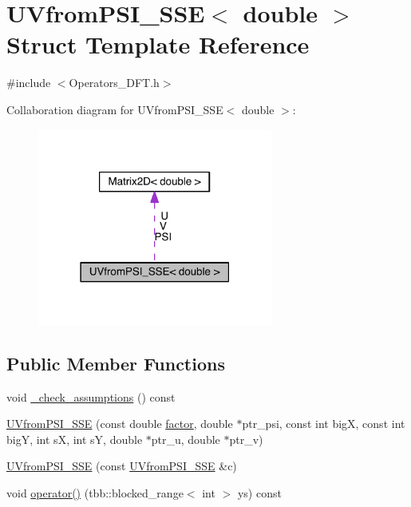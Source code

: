 \hypertarget{struct_u_vfrom_p_s_i___s_s_e_3_01double_01_4}{}\section{U\+Vfrom\+P\+S\+I\+\_\+\+S\+S\+E$<$ double $>$ Struct Template Reference}
\label{struct_u_vfrom_p_s_i___s_s_e_3_01double_01_4}


{\ttfamily \#include $<$Operators\+\_\+\+D\+F\+T.\+h$>$}



Collaboration diagram for U\+Vfrom\+P\+S\+I\+\_\+\+S\+S\+E$<$ double $>$\+:\nopagebreak
\begin{figure}[H]
\begin{center}
\leavevmode
\includegraphics[width=219pt]{dc/d60/struct_u_vfrom_p_s_i___s_s_e_3_01double_01_4__coll__graph}
\end{center}
\end{figure}
\subsection*{Public Member Functions}
\begin{DoxyCompactItemize}
\item 
void \hyperlink{struct_u_vfrom_p_s_i___s_s_e_3_01double_01_4_a819a9b7f93d5acd5dfb2dceb4c4b64a9}{\+\_\+check\+\_\+assumptions} () const 
\item 
\hyperlink{struct_u_vfrom_p_s_i___s_s_e_3_01double_01_4_ab18d50ac5b80e1cbae7d31b2e4db5a63}{U\+Vfrom\+P\+S\+I\+\_\+\+S\+S\+E} (const double \hyperlink{struct_u_vfrom_p_s_i___s_s_e_3_01double_01_4_a13a8e60c24481a28b30a5bfff9de6d57}{factor}, double $\ast$ptr\+\_\+psi, const int big\+X, const int big\+Y, int s\+X, int s\+Y, double $\ast$ptr\+\_\+u, double $\ast$ptr\+\_\+v)
\item 
\hyperlink{struct_u_vfrom_p_s_i___s_s_e_3_01double_01_4_acb95bbecc1ef308681377af43761a365}{U\+Vfrom\+P\+S\+I\+\_\+\+S\+S\+E} (const \hyperlink{struct_u_vfrom_p_s_i___s_s_e}{U\+Vfrom\+P\+S\+I\+\_\+\+S\+S\+E} \&c)
\item 
void \hyperlink{struct_u_vfrom_p_s_i___s_s_e_3_01double_01_4_a2854bee9f48d0ecafb436f53e8dd17ae}{operator()} (tbb\+::blocked\+\_\+range$<$ int $>$ ys) const 
\end{DoxyCompactItemize}

